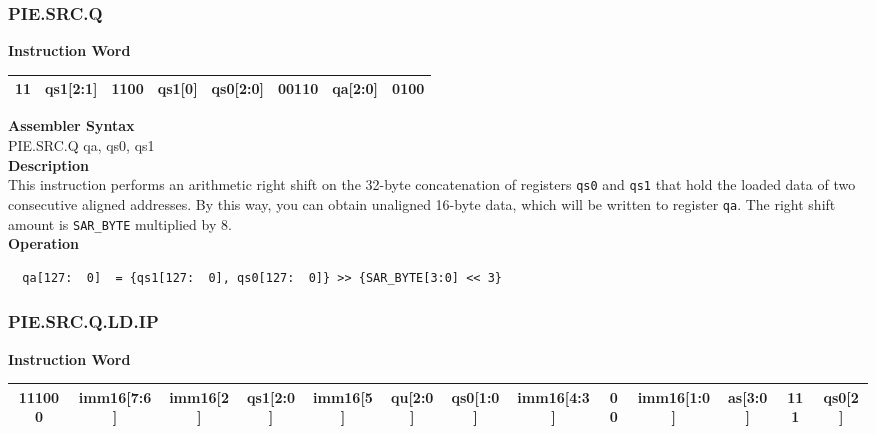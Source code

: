 \newpage
\subsubsection{PIE.SRC.Q}\label{instruction:PIESRCQ}
\setlength\tabcolsep{6pt}
\textbf{Instruction Word} \\
\begin{tabular}{|c|c|c|c|c|c|c|c|}
	\hline
	11 & qs1[2:1] & 1100 & qs1[0] & qs0[2:0] & 00110 & qa[2:0] & 0100 \\
	\hline
\end{tabular}

\textbf{Assembler Syntax} \\
PIE.SRC.Q qa, qs0, qs1 \\
\textbf{Description} \\
This instruction performs an arithmetic right shift on the 32-byte concatenation of registers \lstinline{qs0} and \lstinline{qs1} that hold the loaded data of two consecutive aligned addresses. By this way, you can obtain unaligned 16-byte data, which will be written to register \lstinline{qa}. The right shift amount is \lstinline{SAR_BYTE} multiplied by 8.\\
\textbf{Operation}
\begin{lstlisting}
  qa[127:  0]  = {qs1[127:  0], qs0[127:  0]} >> {SAR_BYTE[3:0] << 3}
\end{lstlisting}

\newpage
\subsubsection{PIE.SRC.Q.LD.IP}\label{instruction:PIESRCQLDIP}
\setlength\tabcolsep{3.5pt}
\textbf{Instruction Word} \\
\begin{tabular}{|c|c|c|c|c|c|c|c|c|c|c|c|c|}
	\hline
	111000 & imm16[7:6] & imm16[2] & qs1[2:0] & imm16[5] & qu[2:0] & qs0[1:0] & imm16[4:3] & 00 & imm16[1:0] & as[3:0] & 111 & qs0[2] \\
	\hline
\end{tabular}


